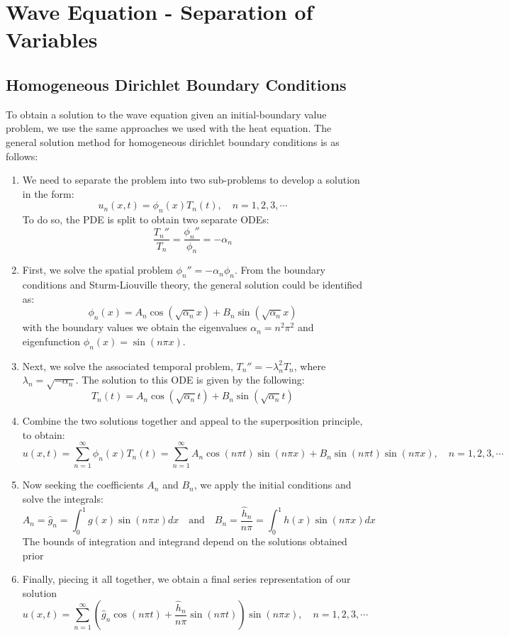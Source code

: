 \documentclass[11pt]{article}
\begin{document}
\pagebreak

\section{Wave Equation - Separation of Variables }
\subsection{Homogeneous Dirichlet Boundary Conditions}
To obtain a solution to the wave equation given an initial-boundary value problem, we use the same approaches we used with the heat equation. The general solution method for homogeneous dirichlet boundary conditions is as follows: 
\begin{enumerate}
\item We need to separate the problem into two sub-problems to develop a solution in the form: 
$$ u_n(x,t) = \phi_n(x) T_n(t), \quad n=1,2,3, \cdots$$
To do so, the PDE is split to obtain two separate ODEs:
$$ \frac{T_n''}{T_n} = \frac{\phi_n''}{\phi_n} = -\alpha_n$$
\item First, we solve the spatial problem $\phi_n'' = -\alpha_n \phi_n$.  From the boundary conditions and Sturm-Liouville theory, the general solution could be identified as:
$$ \phi_n(x) = A_n \cos ( \sqrt{\alpha_n} x) + B_n \sin ( \sqrt{\alpha_n} x)$$
with the boundary values we obtain the eigenvalues $\alpha_n = n^2 \pi ^2$ and eigenfunction $\phi_n(x) = \sin(n \pi x) $.
\item Next, we solve the associated temporal problem, $T_n'' = -\lambda_n^2 T_n$, where $\lambda_n = \sqrt{-\alpha_n}$. The solution to this ODE is given by the following: 
$$ T_n(t) = A_n \cos ( \sqrt{\alpha_n} t) + B_n \sin ( \sqrt{\alpha_n} t)$$
\item Combine the two solutions together and appeal to the superposition principle, to obtain:
$$u(x,t) =   \sum_{n=1}^{\infty}  \phi_n(x) T_n(t) = \sum_{n=1}^{\infty} A_n \cos (n \pi t) \sin (n \pi x) + B_n \sin (n \pi t) \sin(n \pi x), \quad n=1,2,3, \cdots$$
\item Now seeking the coefficients $A_n$ and $B_n$, we apply the initial conditions and solve the integrals:
$$ A_n = \hat{g}_n = \int_0^1 g(x) \sin(n \pi x)dx \quad \text{and} \quad B_n = \frac{\hat{h}_n}{n\pi} = \int_0^1 h(x) \sin(n \pi x)dx $$
The bounds of integration and integrand depend on the solutions obtained prior
\item Finally, piecing it all together, we obtain a final series representation of our solution
$$u(x,t) =  \sum_{n=1}^{\infty} \left( \hat{g}_n \cos(n \pi t) + \frac{\hat{h}_n}{n \pi} \sin (n \pi t) \right)\sin(n\pi x), \quad n=1,2,3, \cdots$$
\end{enumerate}
\end{document}
